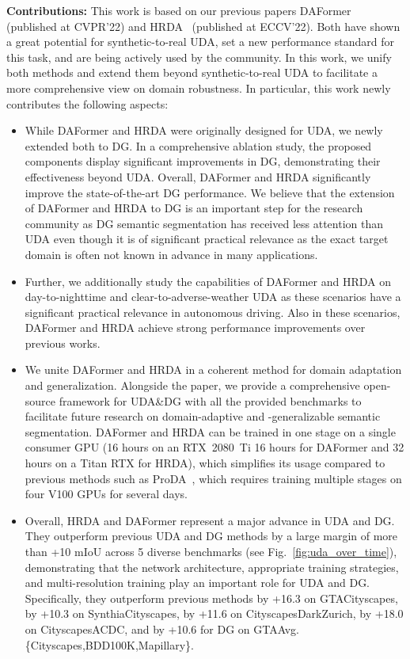 \documentclass[journal,compsoc]{IEEEtran}
\begin{document}
\noindent\textbf{Contributions:}
This work is based on our previous papers DAFormer~\cite{hoyer2021daformer} (published at CVPR'22) and HRDA~\cite{hoyer2022hrda} (published at ECCV'22). Both have shown a great potential for synthetic-to-real UDA, set a new performance standard for this task, and are being actively used by the community. In this work, we unify both methods  and extend them beyond synthetic-to-real UDA to facilitate a more comprehensive view on domain robustness. In particular, this work newly contributes the following aspects:

\begin{itemize}
    \item While DAFormer and HRDA were originally designed for UDA, we newly extended both to DG. In a comprehensive ablation study, the proposed components display significant improvements in DG, demonstrating their effectiveness beyond UDA. Overall, DAFormer and HRDA significantly improve the state-of-the-art DG performance. We believe that the extension of DAFormer and HRDA to DG is an important step for the research community as DG semantic segmentation has received less attention than UDA even though it is of significant practical relevance as the exact target domain is often not known in advance in many applications.
    \item Further, we additionally study the capabilities of DAFormer and HRDA on day-to-nighttime and clear-to-adverse-weather UDA as these scenarios have a significant practical relevance in autonomous driving. Also in these scenarios, DAFormer and HRDA achieve strong performance improvements over previous works.
    \item We unite DAFormer and HRDA in a coherent method for domain adaptation and generalization. Alongside the paper, we provide a comprehensive open-source framework for UDA\&DG with all the provided benchmarks to facilitate future research on domain-adaptive and -generalizable semantic segmentation. DAFormer and HRDA can be trained in one stage on a single consumer GPU (16 hours on an RTX~2080~Ti 16 hours for DAFormer and 32 hours on a Titan RTX for HRDA), which simplifies its usage compared to previous methods such as ProDA~\cite{zhang2021prototypical}, which requires training multiple stages on four V100 GPUs for several days.
    \item Overall, HRDA and DAFormer represent a major advance in UDA and DG. They outperform previous UDA and DG methods by a large margin of more than +10 mIoU across 5 diverse benchmarks (see Fig.~\ref{fig:uda_over_time}), demonstrating that the network architecture, appropriate training strategies, and multi-resolution training play an important role for UDA and DG.
    Specifically, they outperform previous methods by +16.3 on GTACityscapes, by +10.3 on SynthiaCityscapes, by +11.6 on CityscapesDarkZurich, by +18.0 on CityscapesACDC, and by +10.6 for DG on GTAAvg.\{Cityscapes,BDD100K,Mapillary\}.
\end{itemize}
\end{document}
